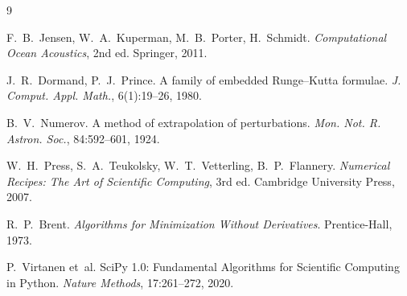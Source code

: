 \documentclass[12pt,a4paper]{article}
\begin{document}
\begin{thebibliography}{9}

  F.~B.~Jensen, W.~A.~Kuperman, M.~B.~Porter, H.~Schmidt.
  \textit{Computational Ocean Acoustics}, 2nd ed.
  Springer, 2011.

  J.~R.~Dormand, P.~J.~Prince.
  A family of embedded Runge--Kutta formulae.
  \textit{J. Comput. Appl. Math.}, 6(1):19--26, 1980.

  B.~V.~Numerov.
  A method of extrapolation of perturbations.
  \textit{Mon. Not. R. Astron. Soc.}, 84:592--601, 1924.

  W.~H.~Press, S.~A.~Teukolsky, W.~T.~Vetterling, B.~P.~Flannery.
  \textit{Numerical Recipes: The Art of Scientific Computing}, 3rd ed.
  Cambridge University Press, 2007.

  R.~P.~Brent.
  \textit{Algorithms for Minimization Without Derivatives}.
  Prentice-Hall, 1973.

  P.~Virtanen et~al.
  SciPy 1.0: Fundamental Algorithms for Scientific Computing in Python.
  \textit{Nature Methods}, 17:261--272, 2020.

\end{thebibliography}
\end{document}
